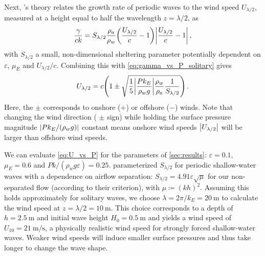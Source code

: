 \documentclass{jfm}
\renewcommand*{\epsilon}{\varepsilon}
\begin{document}
Next, \citeauthor{jeffreys1925formation}'s
\citeyearpar{jeffreys1925formation} theory relates the growth rate of
periodic waves to the wind speed $U_{\lambda/2}$,
measured at a height equal to half the wavelength $z=\lambda/2$, as
\begin{equation}
  \frac{\gamma}{c k} = S_{\lambda/2} \frac{\rho_a}{\rho_w}
    \pqty{\frac{U_{\lambda/2}}{c}-1}
    \abs{\frac{U_{\lambda/2}}{c}-1} \,,
  \label{eq:gamma_vs_u_jeffreys}
\end{equation}
with $S_{\lambda/2}$ a small, non-dimensional sheltering parameter
potentially dependent on $\epsilon$, $\mu_E$ and $U_{\lambda/2}/c$.
Combining this with \cref{eq:gamma_vs_P_solitary} gives
\begin{equation}
  U_{\lambda/2} = c \pqty{1 \pm \sqrt{\frac{1}{5} \abs{\frac{P k_E}{\rho_w g}}
    \frac{\rho_w}{\rho_a} \frac{1}{S_{\lambda/2}}}} \,.
  \label{eq:U_vs_P}
\end{equation}
Here, the $\pm$ corresponds to onshore ($+$) or offshore ($-$) winds.
Note that changing the wind direction (\ie{} $\pm$ sign) while holding
the surface pressure magnitude $\abs{Pk_E/(\rho_w g)}$ constant means
onshore wind speeds $\abs{U_{\lambda/2}}$ will be larger than offshore
wind speeds.

We can evaluate \cref{eq:U_vs_P} for the parameters of
\cref{sec:results}: $\epsilon=0.1$, $\mu_E = 0.6$ and $Pk/(\rho_w g
\epsilon) = 0.25$.
 parameterized $S_{\lambda/2}$ for
periodic shallow-water waves with a dependence on airflow separation:
$S_{\lambda/2} = 4.91 \epsilon \sqrt{\mu}$ for our non-separated
flow (according to their criterion), with $\mu \coloneqq (kh)^2$.
Assuming this holds approximately for solitary waves, we choose $\lambda
= 2 \pi/k_E = \SI{20}{\meter}$ to calculate the wind speed at $z
= \lambda/2 = \SI{10}{\meter}$.
This choice corresponds to a depth of $h = \SI{2.5}{\meter}$ and initial
wave height $H_0 = \SI{0.5}{\meter}$ and yields a wind speed of $U_{10}
= \SI{21}{\meter\per\second}$, a physically realistic wind speed for
strongly forced shallow-water waves.
Weaker wind speeds will induce smaller surface pressures and thus take
longer to change the wave shape.
\end{document}
